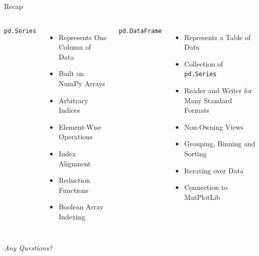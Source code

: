 
\begin{frame}[t,plain]
\titlepage
\end{frame}


\begin{frame}{Recap}
%
\begin{columns}[T]
\texttt{pd.Series}
\begin{itemize}
\item Represents One Column of Data
\item Built on NumPy Arrays
\item Arbitrary Indices
\item Element-Wise Operations
\item Index Alignment
\item Reduction Functions
\item Boolean Array Indexing
\end{itemize}
%
\texttt{pd.DataFrame}
\begin{itemize}
\item Represents a Table of Data
\item Collection of \texttt{pd.Series}
\item Reader and Writer for Many Standard Formats
\item Non-Owning Views
\item Grouping, Binning and Sorting
\item Iterating over Data
\item Connection to MatPlotLib
\end{itemize}

\end{columns}
%
\begin{center}
	\emph{Any Questions?}
\end{center}
%
\end{frame}


